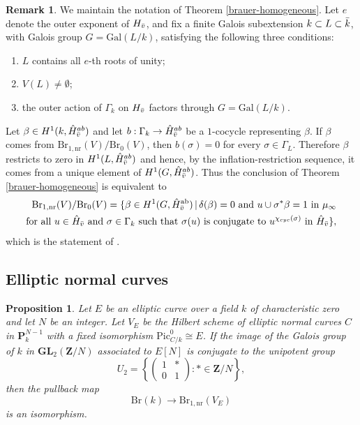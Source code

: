 \documentclass[10pt,letterpaper,twoside]{article}
\renewcommand{\1}{\mathbf{1}}
\newcommand{\bP}{\mathbf{P}}
\newcommand{\bZ}{\mathbf{Z}}
\newcommand{\nr}{\mathrm{nr}}
\newcommand{\GL}{\mathbf{GL}}
\newcommand{\Pic}{\mathrm{Pic}}
\newcommand{\Br}{\mathrm{Br}}
\newcommand{\iso}{\cong}
\theoremstyle{plain}
\newtheorem{proposition}[theorem]{Proposition}
\theoremstyle{plain}
\theoremstyle{definition}
\theoremstyle{named}
\theoremstyle{definition}
\newtheorem{remark}[theorem]{Remark}
\begin{document}
	\begin{remark}
		We maintain the notation of Theorem \ref{brauer-homogeneous}. Let $e$ denote the outer exponent of $H_{\Bar{v}}$, and fix a finite Galois subextension $k\subset L\subset \Bar{k}$, with Galois group $G = \text{Gal}(L/k)$, satisfying the following three conditions:
		\begin{enumerate}
			\item $L$ contains all $e$-th roots of unity;
			\item $V(L) \neq \emptyset$;
			\item the  outer action of $\Gamma_k$ on $H_{\Bar{v}}$ factors through $G = \mathrm{Gal}(L/k)$.
		\end{enumerate}
		Let $\beta\in H^1(k,\hat{H}^{ab}_{\Bar{v}})$ and let $b:\Gamma_k\to \hat{H}^{ab}_{\Bar{v}}$ be a $1$-cocycle representing $\beta$. If $\beta$ comes from $\Br_{1,\nr}(V)/\Br_0(V)$, then $b(\sigma)=0$ for every $\sigma\in \Gamma_L$. Therefore $\beta$ restricts to zero in $H^1(L,\hat{H}^{ab}_{\Bar{v}})$ and hence, by the inflation-restriction sequence, it comes from a unique element of $H^1(G,\hat{H}^{ab}_{\Bar{v}})$. Thus the conclusion of Theorem \ref{brauer-homogeneous} is equivalent to
		\begin{align*}
			\Br_{1,\nr}(V)/\Br_0(V) = \{\beta \in H^1(G, \hat{H}^{\mathrm{ab}}_{\Bar{v}}) \,|\, \delta(\beta) = 0 \text{ and } u \cup \sigma^*\beta = 1 \text{ in $\mu_\infty$}\\
			\text{for all $u \in \hat{H}_{\Bar{v}}$ and $\sigma \in \Gamma_k$ such that $\sigma(u)$ is conjugate to $u^{\chi_{cyc}(\sigma)}$ in $\hat{H}_{\Bar{v}}$}\},
		\end{align*}
		which is the statement of \cite{}.
	\end{remark}
	
	
	
	
	\subsection{Elliptic normal curves}
	
	
	
	\begin{proposition}
		Let $E$ be an elliptic curve over a field $k$ of characteristic zero and let $N$ be an integer. Let $V_E$ be the
		Hilbert scheme of elliptic normal curves $C$ in $\bP^{N-1}_k$
		with a fixed isomorphism $\Pic_{C/k}^0\iso E$. 
		If the image of the Galois group of $k$ in $\GL_2(\bZ/N)$ associated to $E[N]$
		is conjugate to the unipotent group $$U_2=\left\{\begin{pmatrix}1&*\\0&1\end{pmatrix}\colon
		*\in\bZ/N\right\},$$ then the pullback map $$\Br(k)\rightarrow\Br_{1,\nr}(V_E)$$
		is an isomorphism.
	\end{proposition}
	
\end{document}
